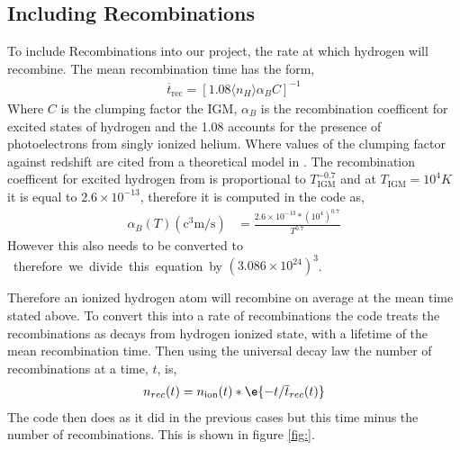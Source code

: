 
\subsection{Including Recombinations} %
\label{sub:including_recombinations}

	To include Recombinations into our project, the rate at which hydrogen will recombine. The mean recombination time\cite{2012ApJ...746..125H} has the form,
	\begin{align}
		\overline{t}_\text{rec}= \left[1.08\langle n_{H}\rangle\alpha_{B}C \right]^{-1}
	\end{align}
	Where $C$ is the clumping factor the IGM, $\alpha_{B}$ is the recombination coefficent for excited states of hydrogen and the 1.08 accounts for the presence of photoelectrons from singly ionized helium.  Where values of the clumping factor against redshift are cited from a theoretical model in \cite{2011MNRAS.412L..16R}. The recombination coefficent for excited hydrogen from \cite{1993PhyA..192..249L} is proportional to $T_\text{IGM}^{-0.7}$ and at $T_\text{IGM}= 10^{4}K$ it is equal to $2.6\times 10^{-13}$, therefore it is computed in the code as,
	\begin{align}
		\alpha_{B}(T)(\si{\cubic\centi\metre\per\second}) &= \frac{2.6\times 10^{-13}*(10^{4})^{0.7}}{T^{0.7}}
	\end{align}
	However this also needs to be converted to \si{\cubic\mega\parsec} therefore we divide this equation by $(3.086\times 10^{24})^{3}$.

	Therefore an ionized hydrogen atom will recombine on average at the mean time stated above. To convert this into a rate of recombinations the code treats the recombinations as decays from hydrogen ionized state, with a lifetime of the mean recombination time. Then using the universal decay law the number of recombinations at a time, $t$, is,
	\begin{align}
		n_{rec}(t)=n_\text{ion}(t)*\e{-t/\overline{t}_{rec}(t)}
	\end{align}
	The code then does as it did in the previous cases but this time minus the number of recombinations. This is shown in figure \ref{fig:}.\\





